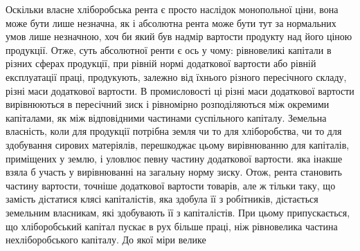 Оскільки власне хліборобська рента є просто наслідок монопольної ціни,
вона може бути лише незначна, як і абсолютна рента може бути тут за нормальних
умов лише незначною, хоч би який був надмір вартости продукту
над його ціною продукції. Отже, суть абсолютної ренти є ось у чому: рівновеликі
капітали в різних сферах продукції, при рівній нормі додаткової вартости
або рівній експлуатації праці, продукують, залежно від їхнього різного пересічного
складу, різні маси додаткової вартости. В промисловості ці різні маси
додаткової вартости вирівнюються в пересічний зиск і рівномірно розподіляються
між окремими капіталами, як між відповідними частинами суспільного капіталу.
Земельна власність, коли для продукції потрібна земля чи то для хліборобства,
чи то для здобування сирових матеріялів, перешкоджає цьому вирівнюванню для
капіталів, приміщених у землю, і уловлює певну частину додаткової вартости.
яка інакше взяла б участь у вирівнюванні на загальну норму зиску. Отож,
рента становить частину вартости, точніше додаткової вартости товарів, але ж
тільки таку, що замість дістатися клясі капіталістів, яка здобула її з робітників,
дістається земельним власникам, які здобувають її з капіталістів. При
цьому припускається, що хліборобський капітал пускає в рух більше праці,
ніж рівновелика частина нехліборобського капіталу. До якої міри велике
\parbreak{}  %
